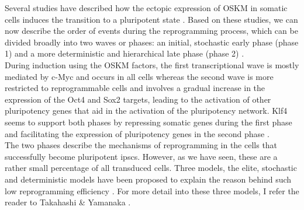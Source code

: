 Several studies have described how the ectopic expression of OSKM in somatic cells induces the transition to a pluripotent state \cite{yamanaka2007strategies, brambrink2008sequential, stadtfeld2008induced, polo2012molecular, hansson2012highly, buganim2012single}. 
Based on these studies, we can now describe the order of events during the reprogramming process, which can be divided broadly into two waves or phases: an initial, stochastic early phase (phase 1) and a more deterministic and hierarchical late phase (phase 2) \cite{omole2018ten, takahashi2016decade, brouwer2016choices}.\\

During induction using the OSKM factors, the first transcriptional wave is mostly mediated by c-Myc and occurs in all cells whereas the second wave is more restricted to reprogrammable cells and involves a gradual increase in the expression of the Oct4 and Sox2 targets, leading to the activation of other pluripotency genes that aid in the activation of the pluripotency network. 
Klf4 seems to support both phases by repressing somatic genes during the first phase and facilitating the expression of pluripotency genes in the second phase \cite{buganim2013mechanisms}.\\

The two phases describe the mechanisms of reprogramming in the cells that successfully become pluripotent \glspl{ipsc}.
However, as we have seen, these are a rather small percentage of all transduced cells.
Three models, the elite, stochastic and deterministic models have been proposed to explain the reason behind such low reprogramming efficiency \cite{omole2018ten}.
For more detail into these three models, I refer the reader to Takahashi \& Yamanaka \cite{takahashi2016decade}.

